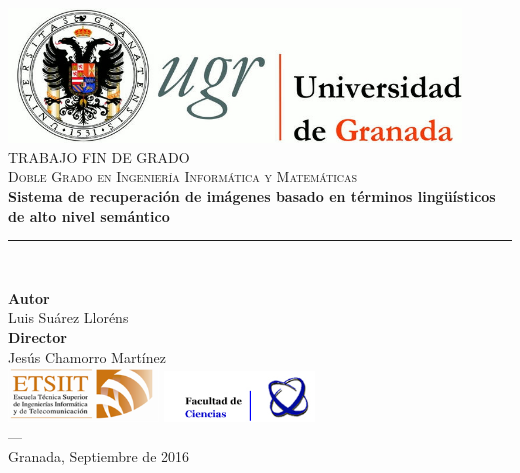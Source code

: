 \begin{titlepage}
 
 
\newlength{\centeroffset}
\setlength{\centeroffset}{-0.5\oddsidemargin}
\addtolength{\centeroffset}{0.5\evensidemargin}
\thispagestyle{empty}

\noindent\hspace*{\centeroffset}\begin{minipage}{\textwidth}

\centering
\includegraphics[width=0.9\textwidth]{img/logo_ugr.jpg}\\[1.4cm]

\textsc{ \Large TRABAJO FIN DE GRADO\\[0.2cm]}
\textsc{ Doble Grado en Ingeniería Informática y Matemáticas}\\[1cm]
% 
{\LARGE\bfseries Sistema de recuperación de imágenes basado en
términos lingüísticos de alto nivel semántico
\\
}
\noindent\rule[-1ex]{\textwidth}{3pt}\\[3.5ex]
\end{minipage}

\vspace{2.5cm}
\noindent\hspace*{\centeroffset}\begin{minipage}{\textwidth}
\centering

\textbf{Autor}\\ {Luis Suárez Lloréns}\\[2.5ex]
\textbf{Director}\\
{Jesús Chamorro Martínez}\\[2cm]
\includegraphics[width=0.3\textwidth]{img/logo_etsiit.png} \hfill \includegraphics[width=0.3\textwidth]{img/logo_ciencias.jpg}\\[0.1cm]
\textsc{---}\\
Granada, Septiembre de 2016
\end{minipage}
\end{titlepage}